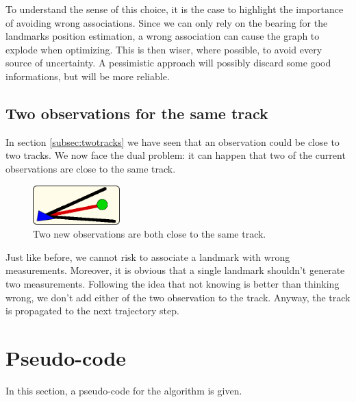 To understand the sense of this choice, it is the case to highlight the importance of avoiding wrong associations.
Since we can only rely on the bearing for the landmarks position estimation, a wrong association can cause the graph to explode when optimizing.
This is then wiser, where possible, to avoid every source of uncertainty.
A pessimistic approach will possibly discard some good informations, but will be more reliable.

\subsection{Two observations for the same track}
In section \ref{subsec:twotracks} we have seen that an observation could be close to two tracks.
We now face the dual problem: it can happen that two of the current observations are close to the same track.

\begin{figure}[htbp]
  \centering
    \includegraphics[width=0.3\textwidth]{images/uncertainty2.png}
  \caption{Two new observations are both close to the same track.}
  \label{fig:uncertainty2}
\end{figure}

Just like before, we cannot risk to associate a landmark with wrong measurements.
Moreover, it is obvious that a single landmark shouldn't generate two measurements.
Following the idea that not knowing is better than thinking wrong, we don't add either of the two observation to the track.
Anyway, the track is propagated to the next trajectory step.

\section{Pseudo-code}\label{sec:pseudocode}
In this section, a pseudo-code for the algorithm is given.

